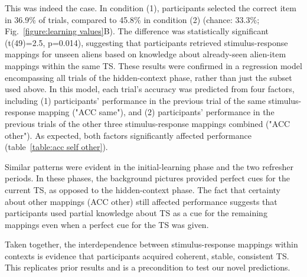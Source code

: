 \documentclass[10pt, letterpaper]{article}
\begin{document}
This was indeed the case. In condition (1), participants selected the correct item in 36.9\% of trials, compared to 45.8\% in condition (2) (chance: 33.3\%; Fig.~\ref{figure:learning values}B). The difference was statistically significant (t(49)=2.5, p=0.014), suggesting that participants retrieved stimulus-response mappings for unseen aliens based on knowledge about already-seen alien-item mappings within the same TS. These results were confirmed in a regression model encompassing all trials of the hidden-context phase, rather than just the subset used above. In this model, each trial's accuracy was predicted from four factors, including (1) participants' performance in the previous trial of the same stimulus-response mapping ("ACC same"), and (2) participants' performance in the previous trials of the other three stimulus-response mappings combined ("ACC other"). As expected, both factors significantly affected performance (table~\ref{table:acc self other}). 

Similar patterns were evident in the initial-learning phase and the two refresher periods. In these phases, the background pictures provided perfect cues for the current TS, as opposed to the hidden-context phase. The fact that certainty about other mappings (ACC other) still affected performance suggests that participants used partial knowledge about TS as a cue for the remaining mappings even when a perfect cue for the TS was given.

Taken together, the interdependence between stimulus-response mappings within contexts is evidence that participants acquired coherent, stable, consistent TS. This replicates prior results \cite{collins_cognitive_2013} and is a precondition to test our novel predictions.
\end{document}
